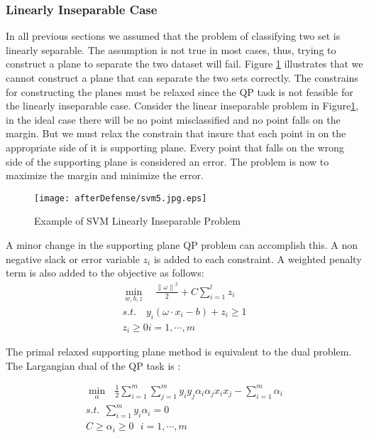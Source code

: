 \subsubsection{Linearly Inseparable Case}
In all previous sections we assumed that the problem of classifying two set is linearly separable. The assumption is not true in most cases, thus, trying to construct a plane to separate the two dataset will fail. Figure \ref{fig:svm5} illustrates that we cannot construct a plane that can separate the two sets correctly. The constrains for constructing the planes must be relaxed since the QP task is not feasible for the linearly inseparable case.  Consider the linear inseparable problem in Figure\ref{fig:svm5}, in the ideal case there will be no point misclassified and no point falls on the margin. But we must relax the constrain that insure that each point in on the appropriate side of it is supporting plane. Every point that falls on the wrong side of the supporting plane is considered an error. The problem is now to maximize the margin and minimize the error.  
 
\begin{figure}
	\centering
		\texttt{[image: afterDefense/svm5.jpg.eps]}
	\caption{Example of SVM Linearly Inseparable Problem}
	\label{fig:svm5}
\end{figure}
A minor change in the supporting plane QP problem can accomplish this. A non negative slack or error variable $z_i$ is added to each constraint.  A weighted penalty term is also added to the objective as follows:
 \begin{equation}
 \begin{array}{c}
\min_{w,b,z}  \quad \frac{{\parallel \omega \parallel}^2}{2}+C \sum_{i=1}^{l}z_i  \\
s.t.  \quad y_i(\omega \cdot x_i -b)+z_i \geq 1  \\
    z_i \geq 0  i=1,\cdots,m
\end{array} 
\label{eq:inseperable}
\end{equation} 

The primal relaxed supporting plane method is equivalent to the dual problem. The Largangian dual of the QP task is :

\begin{equation}
\begin{array}{c}
\min_{\alpha} \ \ \   \frac{1}{2} \sum_{i=1}^{m}{\sum_{j=1}^{m}{y_iy_j\alpha_i\alpha_jx_ix_j}} - \sum_{i=1}^{m}{\alpha_i} \\
s.t. \ \ \sum_{i=1}^{m}{y_i\alpha_i}=0   \\
 C \geq \alpha_i \geq 0  \ \ \ i=1,\cdots , m 
 \end{array} 
\label{eq:dual}
\end{equation}




